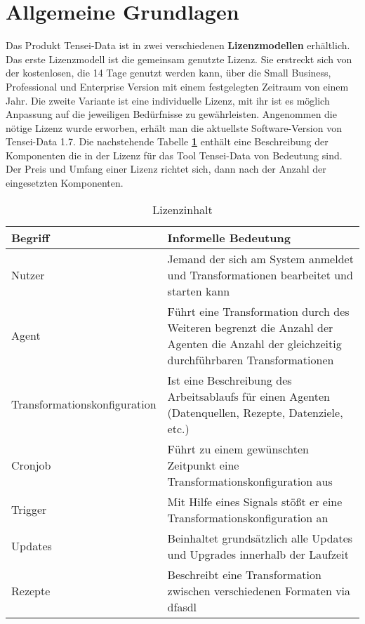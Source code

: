 \section{Allgemeine Grundlagen}
Das Produkt Tensei-Data ist in zwei verschiedenen \textbf{Lizenzmodellen} erhältlich. Das erste Lizenzmodell ist die gemeinsam genutzte Lizenz. Sie erstreckt sich von der kostenlosen, die 14 Tage genutzt werden kann, über die Small Business, Professional und  Enterprise Version mit einem festgelegten Zeitraum von einem Jahr. Die zweite Variante ist eine individuelle Lizenz, mit ihr ist es möglich Anpassung auf die jeweiligen Bedürfnisse zu gewährleisten. Angenommen die nötige Lizenz wurde erworben, erhält man die aktuellste Software-Version von Tensei-Data 1.7. \cite{wegtam:liz}
Die nachstehende Tabelle \textbf{\ref{tab:lizenz:wegtam}} enthält eine Beschreibung der Komponenten die in der Lizenz für das Tool Tensei-Data von Bedeutung sind. Der Preis und Umfang einer Lizenz richtet sich, dann nach der Anzahl der eingesetzten Komponenten.
\begin{table}[h]
	\begin{center}
		\caption{Lizenzinhalt}
		\begin{tabularx}{\textwidth}{|X|X|}
			\hline
			\textbf{Begriff}& \textbf{Informelle Bedeutung}\\
			\hline
			Nutzer& Jemand der sich am System anmeldet und Transformationen bearbeitet und starten kann\\
			\hline
			Agent& Führt eine Transformation durch des Weiteren begrenzt die Anzahl der Agenten die Anzahl der gleichzeitig durchführbaren Transformationen\\
			\hline
			Transformationskonfiguration& Ist eine Beschreibung des Arbeitsablaufs für einen Agenten (Datenquellen, Rezepte, Datenziele, etc.)\\
			\hline
			Cronjob& Führt zu einem gewünschten Zeitpunkt eine Transformationskonfiguration aus\\
			\hline
			Trigger& Mit Hilfe eines Signals stößt er eine Transformationskonfiguration an\\
			\hline
			Updates& Beinhaltet grundsätzlich alle Updates und Upgrades innerhalb der Laufzeit\\
			\hline
			Rezepte& Beschreibt eine Transformation zwischen verschiedenen Formaten via \acrfull{dfasdl}  \\
			\hline
		\end{tabularx}
		\label{tab:lizenz:wegtam}
	\end{center}
\end{table}
